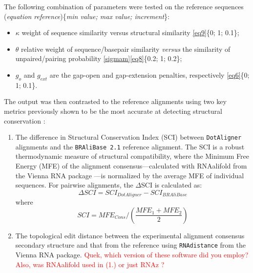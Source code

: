 \documentclass[a4paper,twoside]{article}
\newcommand\dotaligner{\texttt{DotAligner}}
\newcommand\bralibase{\texttt{BRAliBase 2.1}}
\newcommand{\RED}[1]{\textcolor{red}{#1}}
\begin{document}
The following combination of parameters were tested on the reference sequences (\textit{equation 
reference})\{\textit{min value; max value; increment}\}:

\begin{itemize}
	\item $\kappa$ weight of sequence similarity versus structural similarity 
		\eqref{eq9}\{0; 1;  0.1\};
	\item $\theta$ relative weight  of sequence/basepair similarity \textit{versus} 
		the similarity of unpaired/pairing probability \eqref{sigmam}\eqref{eq8}\{0.2; 1; 0.2\};
	\item $g_o$ and $g_{ext}$ are the gap-open and gap-extension penalties, respectively  
		\eqref{eq6}\{0; 1;  0.1\}.
\end{itemize}

\noindent The output was then contrasted to  the reference alignments 
using two key metrics previously shown to be the most accurate at detecting 
structural conservation \cite{gruber2008strategies}: 

 \begin{enumerate}
\item  The difference in Structural Conservation Index (SCI) between \dotaligner{} alignments and
the \bralibase{} reference alignment. The SCI is  a robust thermodynamic measure 
of structural compatibility, where the Minimum Free Energy (MFE) of the alignment 
consensus---calculated with RNAalifold from the Vienna RNA package 
\cite{lorenz2011viennarna}---is normalized by the average MFE of individual 
sequences. For pairwise alignments, the $\Delta $SCI is calculated as:
\begin{equation}\label{dsci}
	\Delta SCI =  SCI_{DotAligner} - SCI_{BRAliBase}
\end{equation} 
where
\begin{equation}\label{sci}
	SCI =  MFE_{Cons} /  \left( \frac{ MFE_1 + MFE_2 }{ 2} \right)   
\end{equation} 

\item  The topological edit distance between the experimental alignment consensus 
secondary structure  and that from the reference using \texttt{RNAdistance} from the Vienna RNA package. 
\RED{Quek, which version of these software did you employ? Also, was RNAalifold used in (1.) or just RNAz ? }
 \end{enumerate}
 
\end{document}

